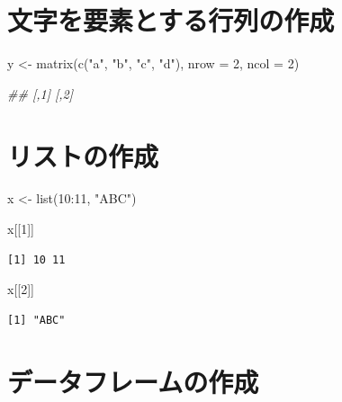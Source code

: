 \documentclass[
  letterpaper,
  DIV=11,
  numbers=noendperiod]{scrreprt}
\newenvironment{Shaded}{\begin{snugshade}}{\end{snugshade}}
\newcommand{\AttributeTok}[1]{\textcolor[rgb]{0.40,0.45,0.13}{#1}}
\newcommand{\DecValTok}[1]{\textcolor[rgb]{0.68,0.00,0.00}{#1}}
\newcommand{\DocumentationTok}[1]{\textcolor[rgb]{0.37,0.37,0.37}{\textit{#1}}}
\newcommand{\FunctionTok}[1]{\textcolor[rgb]{0.28,0.35,0.67}{#1}}
\newcommand{\NormalTok}[1]{\textcolor[rgb]{0.00,0.23,0.31}{#1}}
\newcommand{\OtherTok}[1]{\textcolor[rgb]{0.00,0.23,0.31}{#1}}
\newcommand{\SpecialCharTok}[1]{\textcolor[rgb]{0.37,0.37,0.37}{#1}}
\newcommand{\StringTok}[1]{\textcolor[rgb]{0.13,0.47,0.30}{#1}}
\begin{document}
\section{文字を要素とする行列の作成}\label{ux6587ux5b57ux3092ux8981ux7d20ux3068ux3059ux308bux884cux5217ux306eux4f5cux6210}

\begin{Shaded}
\begin{Highlighting}[]
\NormalTok{y }\OtherTok{\textless{}{-}} \FunctionTok{matrix}\NormalTok{(}\FunctionTok{c}\NormalTok{(}\StringTok{"a"}\NormalTok{, }\StringTok{"b"}\NormalTok{, }\StringTok{"c"}\NormalTok{, }\StringTok{"d"}\NormalTok{), }\AttributeTok{nrow =} \DecValTok{2}\NormalTok{, }\AttributeTok{ncol =} \DecValTok{2}\NormalTok{)}

\DocumentationTok{\#\#      [,1] [,2]}
\end{Highlighting}
\end{Shaded}

\section{リストの作成}\label{ux30eaux30b9ux30c8ux306eux4f5cux6210}

\begin{Shaded}
\begin{Highlighting}[]
\NormalTok{x }\OtherTok{\textless{}{-}} \FunctionTok{list}\NormalTok{(}\DecValTok{10}\SpecialCharTok{:}\DecValTok{11}\NormalTok{, }\StringTok{"ABC"}\NormalTok{)}

\NormalTok{x[[}\DecValTok{1}\NormalTok{]]}
\end{Highlighting}
\end{Shaded}

\begin{verbatim}
[1] 10 11
\end{verbatim}

\begin{Shaded}
\begin{Highlighting}[]
\NormalTok{x[[}\DecValTok{2}\NormalTok{]]}
\end{Highlighting}
\end{Shaded}

\begin{verbatim}
[1] "ABC"
\end{verbatim}

\section{データフレームの作成}\label{ux30c7ux30fcux30bfux30d5ux30ecux30fcux30e0ux306eux4f5cux6210}
\end{document}
